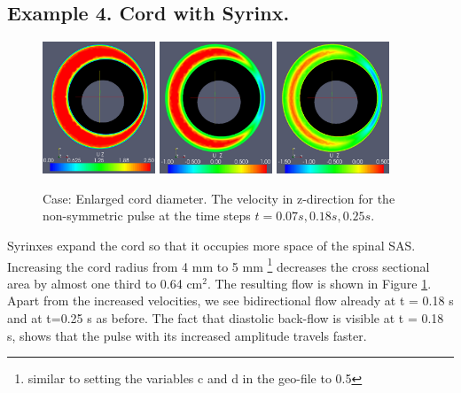 \subsection{Example 4. Cord with Syrinx.}
\begin{figure}\begin{center}
\includegraphics[width=0.3\textwidth]{chapters/hentschel/pdf/pulse_syrinx_f1_08_syrinx05_sysmax_nmb7.pdf}
\includegraphics[width=0.3\textwidth]{chapters/hentschel/pdf/pulse_syrinx_f1_08_syrinx05_sysdia_nmb18.pdf}
\includegraphics[width=0.3\textwidth]{chapters/hentschel/pdf/pulse_syrinx_f1_08_syrinx05_diamin1_nmb25.pdf}
\caption{Case: Enlarged cord diameter. The velocity in z-direction for the non-symmetric pulse at the time steps $t=0.07s, 0.18s, 0.25s$.}
\label{fig:case4}
\end{center}\end{figure}

Syrinxes expand the cord so that it occupies more space of the spinal SAS. Increasing the cord radius from 4 mm to 5 mm \footnote{similar to setting the variables c and d in the geo-file to 0.5} decreases the cross sectional area by almost one third to 0.64 $\mathrm{cm^2}$. The resulting flow is shown in Figure \ref{fig:case4}. Apart from the increased velocities, we see bidirectional flow already at t = 0.18 s and at t=0.25 s as before. The fact that diastolic back-flow is visible at t = 0.18 s, shows that the pulse with its increased amplitude travels faster.

